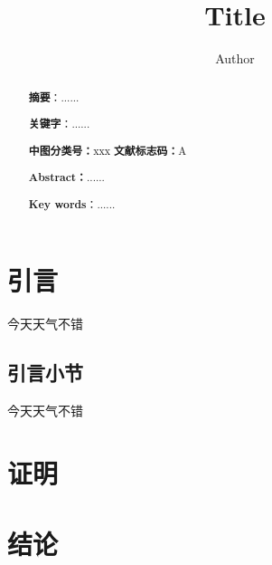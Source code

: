 \documentclass[10.5pt,a4paper,onecolumn]{article}
\title{\vspace{-6ex}Title}
\author{\vspace{-6ex}Author}
\date{}
\begin{document}
\maketitle
\thispagestyle{fancy}

\renewcommand{\abstractname}{}
\begin{abstract}
    \noindent{}\textbf{摘要}：......\par
    \noindent{}\textbf{关键字}：......\par
    \noindent \textbf{中图分类号：}xxx \qquad \textbf{文献标志码：}A
\end{abstract}
\begin{abstract}
    \noindent{}\textbf{Abstract：}......\par
    \noindent{}\textbf{Key words}：......
\end{abstract}

\section{引言}
今天天气不错
\subsection{引言小节}
今天天气不错
\section{证明}
\section{结论}

\newpage
\appendix
\printindex

\printbibliography[title=参考文献]
\end{document}
